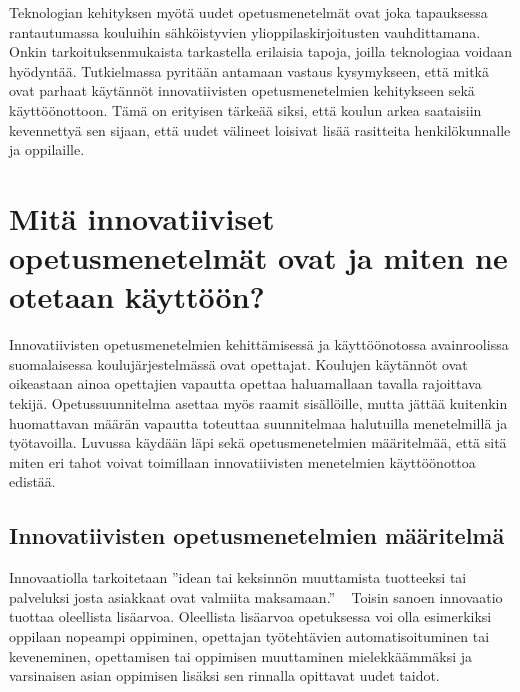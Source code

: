 \documentclass[utf8,bachelor]{gradu3}
\begin{document}
Teknologian kehityksen myötä uudet opetusmenetelmät ovat joka tapauksessa rantautumassa kouluihin sähköistyvien ylioppilaskirjoitusten vauhdittamana. Onkin tarkoituksenmukaista tarkastella erilaisia tapoja, joilla teknologiaa voidaan hyödyntää. Tutkielmassa pyritään antamaan vastaus kysymykseen, että mitkä ovat parhaat käytännöt innovatiivisten opetusmenetelmien kehitykseen sekä käyttöönottoon. Tämä on erityisen tärkeää siksi, että koulun arkea saataisiin kevennettyä sen sijaan, että uudet välineet loisivat lisää rasitteita henkilökunnalle ja oppilaille.





\chapter{Mitä innovatiiviset opetusmenetelmät ovat ja miten ne otetaan käyttöön?} %
Innovatiivisten opetusmenetelmien kehittämisessä ja käyttöönotossa avainroolissa suomalaisessa koulujärjestelmässä ovat opettajat. Koulujen käytännöt ovat oikeastaan ainoa opettajien vapautta opettaa haluamallaan tavalla rajoittava tekijä. Opetussuunnitelma asettaa myös raamit sisällöille, mutta jättää kuitenkin huomattavan määrän vapautta toteuttaa suunnitelmaa halutuilla menetelmillä ja työtavoilla. Luvussa käydään läpi sekä opetusmenetelmien määritelmää, että sitä miten eri tahot voivat toimillaan innovatiivisten menetelmien käyttöönottoa edistää.


\section{Innovatiivisten opetusmenetelmien määritelmä}
Innovaatiolla tarkoitetaan ''idean tai keksinnön muuttamista tuotteeksi tai palveluksi josta asiakkaat ovat valmiita maksamaan.'' ~\parencite[][]{innovaatio} Toisin sanoen innovaatio tuottaa oleellista lisäarvoa. Oleellista lisäarvoa opetuksessa voi olla esimerkiksi oppilaan nopeampi oppiminen, opettajan työtehtävien automatisoituminen tai keveneminen, opettamisen tai oppimisen muuttaminen mielekkäämmäksi ja varsinaisen asian oppimisen lisäksi sen rinnalla opittavat uudet taidot.
\end{document}
